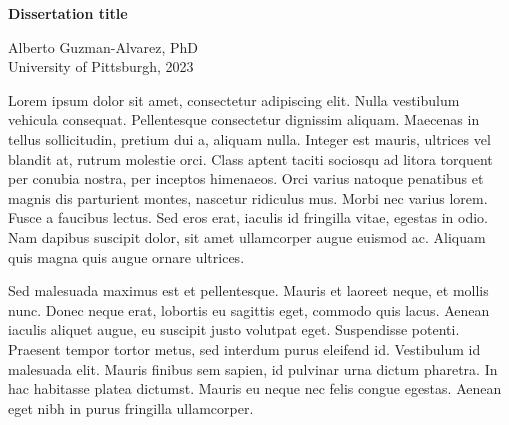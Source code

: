 \pagestyle{plain}

\begin{center}
   \begin{singlespace}
        \textbf{Dissertation title}
   \end{singlespace}
   
   \vspace{1\baselineskip}
   
        Alberto Guzman-Alvarez, PhD\\
        University of Pittsburgh, 2023\\
\end{center}
\vspace*{1\baselineskip}

Lorem ipsum dolor sit amet, consectetur adipiscing elit. Nulla vestibulum vehicula consequat. Pellentesque consectetur dignissim aliquam. Maecenas in tellus sollicitudin, pretium dui a, aliquam nulla. Integer est mauris, ultrices vel blandit at, rutrum molestie orci. Class aptent taciti sociosqu ad litora torquent per conubia nostra, per inceptos himenaeos. Orci varius natoque penatibus et magnis dis parturient montes, nascetur ridiculus mus. Morbi nec varius lorem. Fusce a faucibus lectus. Sed eros erat, iaculis id fringilla vitae, egestas in odio. Nam dapibus suscipit dolor, sit amet ullamcorper augue euismod ac. Aliquam quis magna quis augue ornare ultrices.

Sed malesuada maximus est et pellentesque. Mauris et laoreet neque, et mollis nunc. Donec neque erat, lobortis eu sagittis eget, commodo quis lacus. Aenean iaculis aliquet augue, eu suscipit justo volutpat eget. Suspendisse potenti. Praesent tempor tortor metus, sed interdum purus eleifend id. Vestibulum id malesuada elit. Mauris finibus sem sapien, id pulvinar urna dictum pharetra. In hac habitasse platea dictumst. Mauris eu neque nec felis congue egestas. Aenean eget nibh in purus fringilla ullamcorper.

\newpage